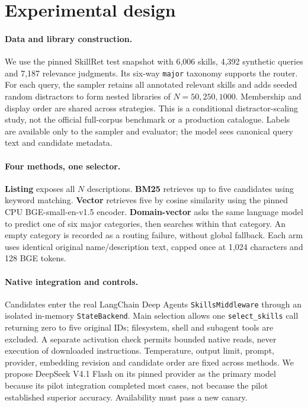 \documentclass{article}
\begin{document}
\section{Experimental design}
\paragraph{Data and library construction.}
We use the pinned SkillRet test snapshot with 6,006 skills, 4,392 synthetic queries
and 7,187 relevance judgments. Its six-way \texttt{major} taxonomy supports the
router. For each query, the sampler retains all annotated relevant skills and
adds seeded random distractors to form nested libraries of $N=50,250,1000$.
Membership and display order are shared across strategies. This is a conditional
distractor-scaling study, not the official full-corpus benchmark or a production
catalogue. Labels are available only to the sampler and evaluator; the model sees
canonical query text and candidate metadata.

\paragraph{Four methods, one selector.}
\textbf{Listing} exposes all $N$ descriptions. \textbf{BM25} retrieves up to five
candidates using keyword matching. \textbf{Vector} retrieves five by cosine
similarity using the pinned CPU BGE-small-en-v1.5 encoder.
\textbf{Domain-vector} asks the same language model to predict one of six major
categories, then searches within that category. An empty category is recorded as
a routing failure, without global fallback. Each arm uses identical original
name/description text, capped once at 1,024 characters and 128 BGE tokens.

\paragraph{Native integration and controls.}
Candidates enter the real LangChain Deep Agents \texttt{SkillsMiddleware} through
an isolated in-memory \texttt{StateBackend}. Main selection allows one
\texttt{select\_skills} call returning zero to five original IDs; filesystem,
shell and subagent tools are excluded. A separate activation check permits
bounded native reads, never execution of downloaded instructions. Temperature,
output limit, prompt, provider, embedding revision and candidate order are fixed
across methods. We propose DeepSeek V4.1 Flash on its pinned provider as the
primary model because its pilot integration completed most cases, not because
the pilot established superior accuracy. Availability must pass a new canary.
\end{document}
